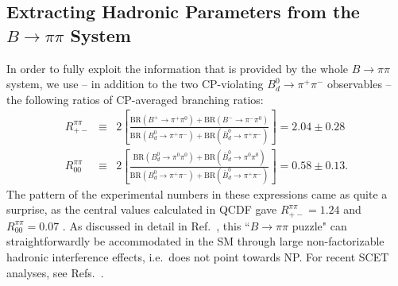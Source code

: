 \documentclass[11pt]{cernrep}
\begin{document}
\subsection{Extracting Hadronic Parameters from the $B\to\pi\pi$ 
System}\label{ssec:Bpipi-hadr}
\unboldmath
%
%
%
In order to fully exploit the information that is provided by the whole $B\to\pi\pi$ 
system, we use -- in addition to the two CP-violating $B^0_d\to\pi^+\pi^-$
observables  -- the following ratios of CP-averaged branching ratios:
\begin{eqnarray}
R_{+-}^{\pi\pi}&\equiv&2\left[\frac{\mbox{BR}(B^+\to\pi^+\pi^0)
+\mbox{BR}(B^-\to\pi^-\pi^0)}{\mbox{BR}(B_d^0\to\pi^+\pi^-)
+\mbox{BR}(\bar B_d^0\to\pi^+\pi^-)}\right]%
=2.04\pm0.28
\label{Rpm-def}\\
R_{00}^{\pi\pi}&\equiv&2\left[\frac{\mbox{BR}(B_d^0\to\pi^0\pi^0)+
\mbox{BR}(\bar B_d^0\to\pi^0\pi^0)}{\mbox{BR}(B_d^0\to\pi^+\pi^-)+
\mbox{BR}(\bar B_d^0\to\pi^+\pi^-)}\right]%
=0.58\pm0.13.
\end{eqnarray}
The pattern of the experimental numbers in these expressions came as quite 
a surprise, as the central values calculated in QCDF gave 
$R_{+-}^{\pi\pi}=1.24$ and $R_{00}^{\pi\pi}=0.07$ \cite{BeNe}. As discussed in 
detail in Ref.~\cite{BFRS3}, this ``$B\to\pi\pi$ puzzle" can straightforwardly be 
accommodated 
in the SM through large non-factorizable hadronic interference effects, i.e.\ 
does not point towards NP. For recent SCET analyses, 
see Refs.~\cite{SCET-Bdpi0K0,BPRS,FeHu}. 
\end{document}
